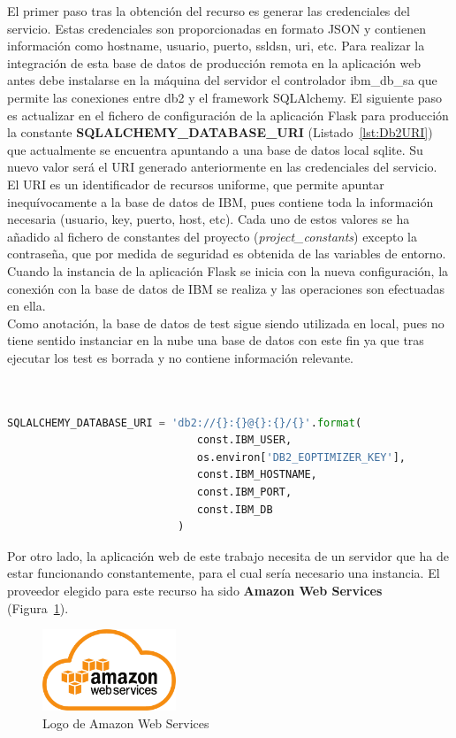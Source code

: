 El primer paso tras la obtención del recurso es generar las credenciales del servicio. Estas credenciales son proporcionadas en formato \gls{JSON} y contienen información como hostname, usuario, puerto, ssldsn, uri, etc. Para realizar la integración de esta base de datos de producción remota en la aplicación web antes debe instalarse en la máquina del servidor el controlador ibm\_db\_sa que permite las conexiones entre db2 y el framework SQLAlchemy. El siguiente paso es actualizar en el fichero de configuración de la aplicación Flask para producción la constante \textbf{SQLALCHEMY\_DATABASE\_URI} (Listado~\ref{lst:Db2URI}) que actualmente se encuentra apuntando a una base de datos local sqlite. Su nuevo valor será el URI generado anteriormente en las credenciales del servicio. El URI es un identificador de recursos uniforme, que permite apuntar inequívocamente a la base de datos de IBM, pues contiene toda la información necesaria (usuario, key, puerto, host, etc). Cada uno de estos valores se ha añadido al fichero de constantes del proyecto (\textit{project\_constants}) excepto la contraseña, que por medida de seguridad es obtenida de las variables de entorno. Cuando la instancia de la aplicación Flask se inicia con la nueva configuración, la conexión con la base de datos de IBM se realiza y las operaciones son efectuadas en ella.\\

Como anotación, la base de datos de test sigue siendo utilizada en local, pues no tiene sentido instanciar en la nube una base de datos con este fin ya que tras ejecutar los test es borrada y no contiene información relevante.\\ \\ \\

\begin{lstlisting}[language=Python,float=ht,numbers=none,caption={URI de Db2 para SQLAlchemy en \textit{prod\_config}},label={lst:Db2URI}]
SQLALCHEMY_DATABASE_URI = 'db2://{}:{}@{}:{}/{}'.format(
                              const.IBM_USER,
                              os.environ['DB2_EOPTIMIZER_KEY'],
                              const.IBM_HOSTNAME,
                              const.IBM_PORT,
                              const.IBM_DB
                           )
\end{lstlisting}

Por otro lado, la aplicación web de este trabajo necesita de un servidor que ha de estar funcionando constantemente, para el cual sería necesario una instancia. El proveedor elegido para este recurso ha sido \textbf{Amazon Web Services}~\cite{AWS} (Figura~\ref{fig:AWS}).
\begin{figure}[H]
            \centering
            \includegraphics[width=4cm]{figs/aws_logo.png}
            \caption{Logo de Amazon Web Services}
            \label{fig:AWS}
\end{figure}

